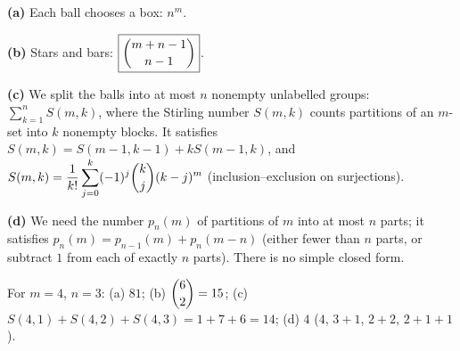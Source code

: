 \textbf{(a)} Each ball chooses a box: $\boxed{n^m}$.

\textbf{(b)} Stars and bars: $\boxed{\dbinom{m+n-1}{n-1}}$.

\textbf{(c)} We split the balls into at most $n$ nonempty unlabelled groups: $\boxed{\displaystyle\sum_{k=1}^{n}S(m,k)}$, where the Stirling number $S(m,k)$ counts partitions of an $m$-set into $k$ nonempty blocks. It satisfies $S(m,k)=S(m-1,k-1)+kS(m-1,k)$, and $S(m,k)=\dfrac1{k!}\displaystyle\sum_{j=0}^{k}(-1)^j\dbinom kj(k-j)^m$ (inclusion--exclusion on surjections).

\textbf{(d)} We need the number $p_n(m)$ of partitions of $m$ into at most $n$ parts; it satisfies $p_n(m)=p_{n-1}(m)+p_n(m-n)$ (either fewer than $n$ parts, or subtract $1$ from each of exactly $n$ parts). There is no simple closed form.

For $m=4$, $n=3$: (a) $81$; (b) $\dbinom62=15$; (c) $S(4,1)+S(4,2)+S(4,3)=1+7+6=14$; (d) $4$ ($4$, $3+1$, $2+2$, $2+1+1$).
